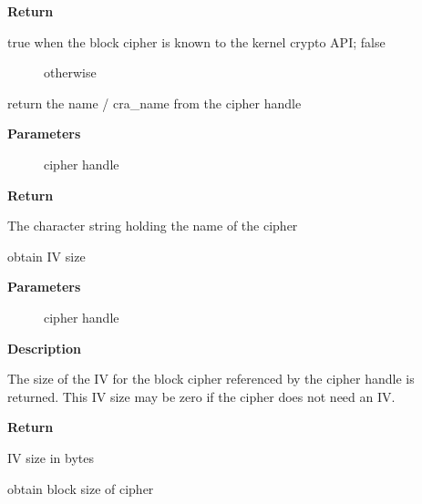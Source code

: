 \documentclass[a4paper,8pt,english]{sphinxmanual}
\begin{document}
\textbf{Return}
\begin{description}
\item[{true when the block cipher is known to the kernel crypto API; false}] \leavevmode
otherwise

\end{description}

\begin{fulllineitems}
\label{crypto/api-skcipher:c.crypto_blkcipher_name}
return the name / cra\_name from the cipher handle

\end{fulllineitems}


\textbf{Parameters}
\begin{description}
\item[{}] \leavevmode
cipher handle

\end{description}

\textbf{Return}

The character string holding the name of the cipher

\begin{fulllineitems}
\label{crypto/api-skcipher:c.crypto_blkcipher_ivsize}
obtain IV size

\end{fulllineitems}


\textbf{Parameters}
\begin{description}
\item[{}] \leavevmode
cipher handle

\end{description}

\textbf{Description}

The size of the IV for the block cipher referenced by the cipher handle is
returned. This IV size may be zero if the cipher does not need an IV.

\textbf{Return}

IV size in bytes

\begin{fulllineitems}
\label{crypto/api-skcipher:c.crypto_blkcipher_blocksize}
obtain block size of cipher

\end{fulllineitems}
\end{document}

